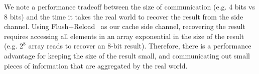 We note a performance tradeoff between the size of communication (e.g. 4 bits vs 8
bits) and the time it takes the real world to recover the result from the side
channel. Using Flush+Reload~\cite{yarom2014flush+} as our cache side channel,
recovering the result requires accessing all elements in an array exponential in
the size of the result (e.g. $2^8$ array reads to recover an 8-bit result). 
Therefore, there is a
performance advantage for keeping the size of the result small, and communicating
out small pieces of information that are aggregated by the real world.


